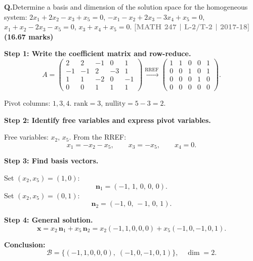 \documentclass[12pt,a3paper]{article}
\newcommand{\yr}[1]{\hfill\textcolor{gray}{\small\textbf{[#1]}}}
\newcommand{\mk}[1]{\textcolor{orange!70!black}{\small\textbf{(#1 marks)}}}
\newcounter{qnum}
\newcommand{\Q}[1]{%
  \needspace{4\baselineskip}
  \refstepcounter{qnum}
  \vspace{6pt}
  \noindent\textbf{Q\theqnum.}\enspace #1\par
}
\begin{document}
\begin{tcolorbox}[enhanced,breakable,
  colback=cC!4,colframe=cC,boxrule=0.8pt,arc=5pt,
  title={\textbf{Answer --- Basis and Coordinates in $M_{22}$}},
  fonttitle=\bfseries\color{white},colbacktitle=cC]
\end{tcolorbox}

\Q{Determine a basis and dimension of the solution space for the homogeneous system:
$2x_1 + 2x_2 - x_3 + x_5 = 0$, $-x_1 - x_2 + 2x_3 - 3x_4 + x_5 = 0$, $x_1 + x_2 - 2x_3 - x_5 = 0$, $x_3 + x_4 + x_5 = 0$.
\yr{MATH 247 | L-2/T-2 | 2017-18} \mk{16.67}}

\begin{tcolorbox}[enhanced,breakable,
  colback=cC!4,colframe=cC,boxrule=0.8pt,arc=5pt,
  title={\textbf{Answer --- Solution Space of Homogeneous System}},
  fonttitle=\bfseries\color{white},colbacktitle=cC]

\textbf{Step 1: Write the coefficient matrix and row-reduce.}
\[
A = \begin{pmatrix}
 2 &  2 & -1 &  0 &  1 \\
-1 & -1 &  2 & -3 &  1 \\
 1 &  1 & -2 &  0 & -1 \\
 0 &  0 &  1 &  1 &  1
\end{pmatrix}
\xrightarrow{\text{RREF}}
\begin{pmatrix}
1 & 1 & 0 & 0 & 1 \\
0 & 0 & 1 & 0 & 1 \\
0 & 0 & 0 & 1 & 0 \\
0 & 0 & 0 & 0 & 0
\end{pmatrix}.
\]

Pivot columns: $1, 3, 4$. \quad $\mathrm{rank} = 3$, \quad $\mathrm{nullity} = 5 - 3 = 2$.

\medskip
\textbf{Step 2: Identify free variables and express pivot variables.}

Free variables: $x_2,\, x_5$. From the RREF:
\[
x_1 = -x_2 - x_5, \qquad x_3 = -x_5, \qquad x_4 = 0.
\]

\textbf{Step 3: Find basis vectors.}

Set $(x_2, x_5) = (1, 0)$:
\[
\mathbf{n}_1 = (-1,\, 1,\, 0,\, 0,\, 0).
\]
Set $(x_2, x_5) = (0, 1)$:
\[
\mathbf{n}_2 = (-1,\, 0,\, -1,\, 0,\, 1).
\]

\textbf{Step 4: General solution.}
\[
\mathbf{x} = x_2\,\mathbf{n}_1 + x_5\,\mathbf{n}_2
= x_2(-1,1,0,0,0) + x_5(-1,0,-1,0,1).
\]

\textbf{Conclusion:}
\[
\boxed{\mathcal{B} = \{(-1,1,0,0,0),\;(-1,0,-1,0,1)\}, \quad \dim = 2.}
\]

\end{tcolorbox}
\end{document}
